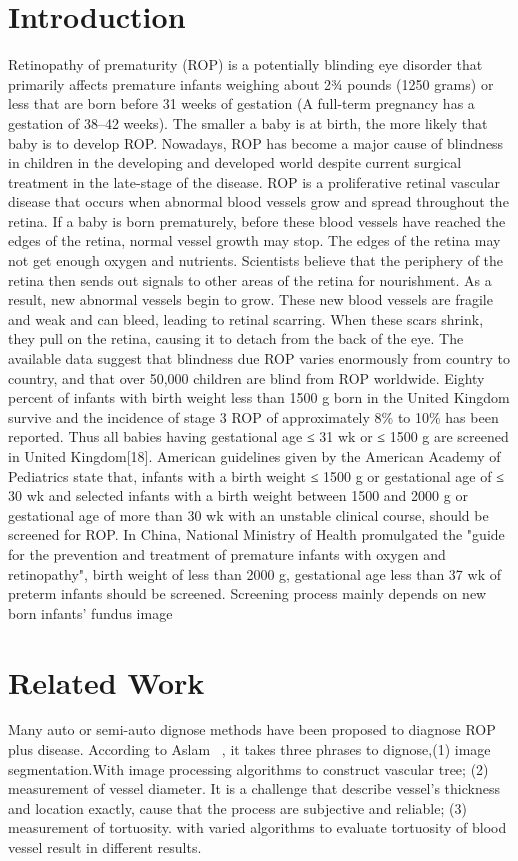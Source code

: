 \documentclass[10pt,twocolumn,letterpaper]{article}
\begin{document}
\section{Introduction}
Retinopathy of prematurity (ROP) is a potentially blinding eye disorder that primarily affects premature infants weighing about 2¾ pounds (1250 grams) or less that are born before 31 weeks of gestation (A full-term pregnancy has a gestation of 38–42 weeks). The smaller a baby is at birth, the more likely that baby is to develop ROP. Nowadays,
ROP has become a major cause of blindness in children in the developing and developed world despite current surgical treatment in the late-stage of the disease\cite{Chen J, Smith L E H.}.
ROP is a proliferative retinal vascular disease that occurs when abnormal blood vessels grow and spread throughout the retina. If a baby is born prematurely, before these blood vessels have reached the edges of the retina, normal vessel growth may stop. The edges of the retina may not get enough oxygen and nutrients. Scientists believe that the periphery of the retina then sends out signals to other areas of the retina for nourishment.
As a result, new abnormal vessels begin to grow. These new blood vessels are fragile and weak and can bleed, leading to retinal scarring. When these scars shrink, they pull on the retina, causing it to detach from the back of the eye.
The available data suggest that blindness due ROP varies enormously from country to country, and that over 50,000 children are blind from ROP worldwide\cite{Gilbert C, Fielder A, Gordillo L, et al.}. Eighty percent of infants with birth weight less than
1500 g born in the United Kingdom survive and the incidence of stage 3 ROP of approximately 8\% to 10\% has been reported\cite{Wilkinson AR, Haines L, Head K, Fielder AR.}. Thus all babies having gestational age ≤ 31 wk or ≤ 1500 g are screened in United Kingdom[18]. American guidelines given by the American Academy of Pediatrics state that,
infants with a birth weight ≤ 1500 g or gestational age of ≤ 30 wk and selected infants with a birth weight between 1500 and 2000 g or gestational age of more than 30 wk with an unstable clinical course, should be screened for ROP\cite{Fierson WM.}. In China, National Ministry of Health promulgated the "guide for the prevention and treatment of premature infants with oxygen and retinopathy", birth weight of less than 2000 g, gestational age less than 37 wk of preterm infants should be screened.
Screening process mainly depends on new born infants' fundus image 


\section{Related Work}
  Many auto or semi-auto dignose methods have been proposed to diagnose ROP plus disease. According to Aslam \etal~\cite{},  it takes three phrases to dignose,(1) image segmentation.With image processing algorithms to construct vascular tree; (2) measurement of vessel diameter. It is a challenge that describe vessel's thickness and location exactly, cause that the process are subjective and reliable; (3) measurement of tortuosity. with varied algorithms to evaluate tortuosity of blood vessel result in different results.
\end{document}
